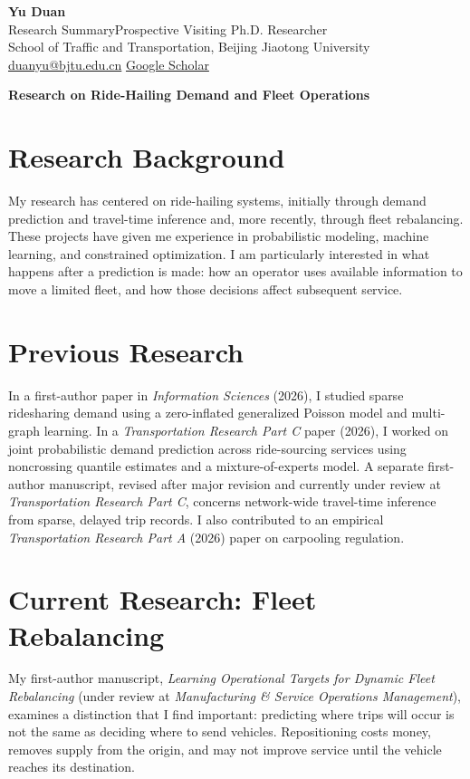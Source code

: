 \documentclass[11pt]{article}
\begin{document}
\begin{center}
 \Large\textbf{Yu Duan}\normalsize\\[3pt]
 Research Summary\quad\textbar\quad Prospective Visiting Ph.D. Researcher\\[2pt]
 School of Traffic and Transportation, Beijing Jiaotong University\\[2pt]
 \href{mailto:duanyu@bjtu.edu.cn}{duanyu@bjtu.edu.cn}\quad\textbar\quad
 \href{https://scholar.google.com/citations?user=pLcJk40AAAAJ}{Google Scholar}
\end{center}
\RaggedRight
\begin{center}
 \large\textbf{Research on Ride-Hailing Demand and Fleet Operations}
\end{center}
\vspace{-5pt}

\section*{Research Background}
My research has centered on ride-hailing systems, initially through demand prediction and travel-time inference and, more recently, through fleet rebalancing. These projects have given me experience in probabilistic modeling, machine learning, and constrained optimization. I am particularly interested in what happens after a prediction is made: how an operator uses available information to move a limited fleet, and how those decisions affect subsequent service.

\section*{Previous Research}
In a first-author paper in \emph{Information Sciences} (2026), I studied sparse ridesharing demand using a zero-inflated generalized Poisson model and multi-graph learning. In a \emph{Transportation Research Part C} paper (2026), I worked on joint probabilistic demand prediction across ride-sourcing services using noncrossing quantile estimates and a mixture-of-experts model. A separate first-author manuscript, revised after major revision and currently under review at \emph{Transportation Research Part C}, concerns network-wide travel-time inference from sparse, delayed trip records. I also contributed to an empirical \emph{Transportation Research Part A} (2026) paper on carpooling regulation.

\section*{Current Research: Fleet Rebalancing}
My first-author manuscript, \emph{Learning Operational Targets for Dynamic Fleet Rebalancing} (under review at \emph{Manufacturing \& Service Operations Management}), examines a distinction that I find important: predicting where trips will occur is not the same as deciding where to send vehicles. Repositioning costs money, removes supply from the origin, and may not improve service until the vehicle reaches its destination.
\end{document}
